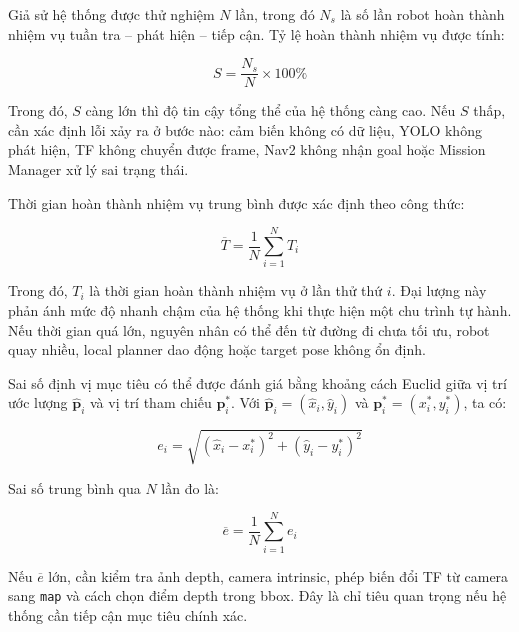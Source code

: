 Giả sử hệ thống được thử nghiệm $N$ lần, trong đó $N_s$ là số lần robot hoàn thành nhiệm vụ tuần tra -- phát hiện -- tiếp cận. Tỷ lệ hoàn thành nhiệm vụ được tính:

\begin{equation}
    S = \frac{N_s}{N}\times 100\%
    \label{eq:mission-success-rate}
\end{equation}

Trong đó, $S$ càng lớn thì độ tin cậy tổng thể của hệ thống càng cao. Nếu $S$ thấp, cần xác định lỗi xảy ra ở bước nào: cảm biến không có dữ liệu, YOLO không phát hiện, TF không chuyển được frame, Nav2 không nhận goal hoặc Mission Manager xử lý sai trạng thái.

Thời gian hoàn thành nhiệm vụ trung bình được xác định theo công thức:

\begin{equation}
    \overline{T}
    =
    \frac{1}{N}
    \sum_{i=1}^{N} T_i
    \label{eq:average-mission-time}
\end{equation}

Trong đó, $T_i$ là thời gian hoàn thành nhiệm vụ ở lần thử thứ $i$. Đại lượng này phản ánh mức độ nhanh chậm của hệ thống khi thực hiện một chu trình tự hành. Nếu thời gian quá lớn, nguyên nhân có thể đến từ đường đi chưa tối ưu, robot quay nhiều, local planner dao động hoặc target pose không ổn định.

Sai số định vị mục tiêu có thể được đánh giá bằng khoảng cách Euclid giữa vị trí ước lượng $\widehat{\mathbf{p}}_i$ và vị trí tham chiếu $\mathbf{p}_i^{*}$. Với $\widehat{\mathbf{p}}_i=(\widehat{x}_i,\widehat{y}_i)$ và $\mathbf{p}_i^{*}=(x_i^{*},y_i^{*})$, ta có:

\begin{equation}
    e_i
    =
    \sqrt{
        \left(\widehat{x}_i-x_i^{*}\right)^2
        +
        \left(\widehat{y}_i-y_i^{*}\right)^2
    }
    \label{eq:target-localization-error}
\end{equation}

Sai số trung bình qua $N$ lần đo là:

\begin{equation}
    \overline{e}
    =
    \frac{1}{N}
    \sum_{i=1}^{N} e_i
    \label{eq:average-target-localization-error}
\end{equation}

Nếu $\overline{e}$ lớn, cần kiểm tra ảnh depth, camera intrinsic, phép biến đổi TF từ camera sang \texttt{map} và cách chọn điểm depth trong bbox. Đây là chỉ tiêu quan trọng nếu hệ thống cần tiếp cận mục tiêu chính xác.

